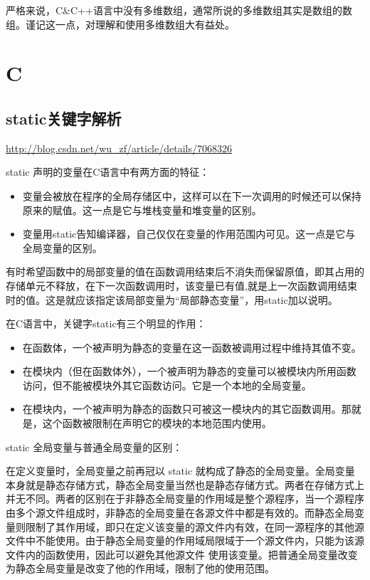 严格来说，C\&C++语言中没有多维数组，通常所说的多维数组其实是数组的数组。谨记这一点，对理解和使用多维数组大有益处。






\chapter{C}
\section{static关键字解析}
\url{http://blog.csdn.net/wu_zf/article/details/7068326}

static 声明的变量在C语言中有两方面的特征：

\begin{itemize}
\item 变量会被放在程序的全局存储区中，这样可以在下一次调用的时候还可以保持原来的赋值。这一点是它与堆栈变量和堆变量的区别。

\item 变量用static告知编译器，自己仅仅在变量的作用范围内可见。这一点是它与全局变量的区别。
\end{itemize}

有时希望函数中的局部变量的值在函数调用结束后不消失而保留原值，即其占用的存储单元不释放，在下一次函数调用时，该变量已有值,就是上一次函数调用结束时的值。这是就应该指定该局部变量为“局部静态变量”，用static加以说明。

在C语言中，关键字static有三个明显的作用：
\begin{itemize}
\item 在函数体，一个被声明为静态的变量在这一函数被调用过程中维持其值不变。
\item 在模块内（但在函数体外），一个被声明为静态的变量可以被模块内所用函数访问，但不能被模块外其它函数访问。它是一个本地的全局变量。
\item 在模块内，一个被声明为静态的函数只可被这一模块内的其它函数调用。那就是，这个函数被限制在声明它的模块的本地范围内使用。
\end{itemize}

static 全局变量与普通全局变量的区别：

在定义变量时，全局变量之前再冠以 static 就构成了静态的全局变量。全局变量本身就是静态存储方式，静态全局变量当然也是静态存储方式。两者在存储方式上并无不同。两者的区别在于非静态全局变量的作用域是整个源程序，当一个源程序由多个源文件组成时，非静态的全局变量在各源文件中都是有效的。而静态全局变量则限制了其作用域，即只在定义该变量的源文件内有效，在同一源程序的其他源文件中不能使用。由于静态全局变量的作用域局限域于一个源文件内，只能为该源文件内的函数使用，因此可以避免其他源文件 使用该变量。把普通全局变量改变为静态全局变量是改变了他的作用域，限制了他的使用范围。

